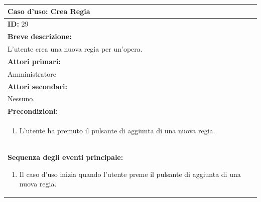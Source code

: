 \documentclass{article}
\begin{document}
                \begin{table}[H]
                    \begin{tabular}{|p{\linewidth}|}
                        \hline
                        \cellcolor{gray!100}
                        \color{white}
                        \centerline{\textbf{Caso d'uso:} Crea Regia} \\
                        \hline
                        \textbf{ID:} 29 \\
                        \hline
                        \cellcolor{gray!20}
                        \textbf{Breve descrizione:} \\
                        \cellcolor{gray!20}
                        L'utente crea una nuova regia per un'opera. \\
                        \hline
                        \textbf{Attori primari:} \\
                        \begin{minipage}{\linewidth}
                            Amministratore
                        \end{minipage}
                        \vspace{-10pt} \\ %
                        \hline
                        \textbf{Attori secondari:} \\
                        Nessuno. \\
                        \hline
                        \cellcolor{gray!20}
                        \textbf{Precondizioni:} \\
                        \cellcolor{gray!20}
                        \begin{minipage}{\linewidth}
                            \begin{enumerate}
                                \item L'utente ha premuto il pulsante di aggiunta di una nuova regia.
                            \end{enumerate}
                        \end{minipage} \\
                        \hline
                        \textbf{Sequenza degli eventi principale:}
                        \begin{enumerate}
                            \item Il caso d'uso inizia quando l'utente preme il pulsante di aggiunta di una nuova regia.

\end{enumerate}
\end{tabular}
\end{table}
\end{document}
